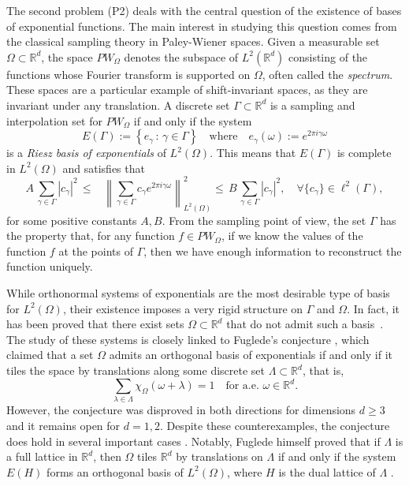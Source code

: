 \documentclass[a4paper,11pt]{amsart}
\theoremstyle{definition}
\theoremstyle{definition}
\def\w{\omega}
\def\R{\mathbb{R}}
\begin{document}
	\noindent The second problem (P2) deals with the central question of the existence of bases of exponential functions. The main interest in studying this question comes from the classical sampling theory in Paley-Wiener spaces. Given a measurable set~$\Omega\subset\R^d$, the space $PW_\Omega$ denotes the subspace of $L^2(\R^d)$ consisting of the functions whose Fourier transform is supported on $\Omega$, often called the \textit{spectrum}. These spaces are a particular example of shift-invariant spaces, as they are invariant under any translation. A discrete set $\Gamma\subset\R^d$ is a sampling and interpolation set for $PW_\Omega$ if and only if the system $$E(\Gamma):=\left\{e_\gamma\,:\,\gamma\in\Gamma\right\} \quad \text{where}\quad e_\gamma(\w) := e^{2\pi i \gamma \omega} $$ is a  {\it Riesz basis of exponentials} of $L^2(\Omega).$
	This means that $E(\Gamma)$ is complete in $L^2(\Omega)$ and satisfies that
	\begin{equation}\label{eq:RBE}
		A\,\sum_{\gamma\in\Gamma} |c_\gamma|^2\,\leq\;\;\; \left\|\sum_{\gamma\in\Gamma} c_\gamma e^{2\pi i \gamma\w}\right\|^{2}_{L^2(\Omega)}\leq \,B\,\sum_{\gamma\in\Gamma}|c_\gamma|^2,\quad\forall \{c_\gamma\}\in\ell^2(\Gamma),
	\end{equation}
	for some positive constants $A,B$. From the sampling point of view, the set $\Gamma$ has the property that, for any function $f\in PW_\Omega$, if we know the values of the function $f$ at the points of $\Gamma$, then we have enough information to reconstruct the function uniquely. 
	
	While orthonormal systems of exponentials are the most desirable type of basis for $L^2(\Omega)$, their existence imposes a very rigid structure on $\Gamma$ and $\Omega$. In fact, it has been proved that there exist sets $\Omega\subset\R^d$ that do not admit such a basis~\cite{Fu01,Ko00,La01}. The study of these systems is closely linked to Fuglede's conjecture \cite{Fu74}, which claimed that a set $\Omega$ admits an orthogonal basis of exponentials if and only if it tiles the space by translations along some discrete set $\Lambda\subset \R^d$, that is, $$\sum_{\lambda\in\Lambda} \chi_{\Omega}(\w+\lambda) = 1 \quad \text{for a.e. }\w\in\R^d.$$ 
	However, the conjecture was disproved in both directions for dimensions $d\geq 3$ \cite{T04, KM06, FMM06, FR06} and it remains open for $d=1,2$. Despite these counterexamples, the conjecture does hold in several important cases \cite{La01,IKT03, LM22}. Notably, Fuglede himself proved that if $\Lambda$ is a full lattice in $\R^d$, then $\Omega$ tiles $\R^d$ by translations on $\Lambda$ if and only if the system $E(H)$ forms an orthogonal basis of $L^2(\Omega)$, where $H$ is the dual lattice of $\Lambda$ \cite{Fu74}. 
	
\end{document}

